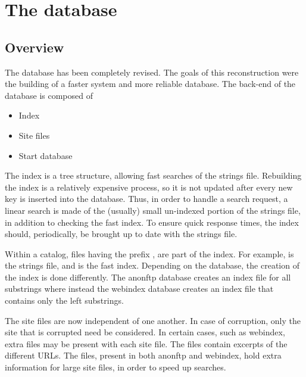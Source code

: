 %
%
%
%




\chapter{The database}
\label{chap:db}
\new

\section{Overview}

The database has been completely revised. The goals of this reconstruction
were the building of a faster system and more reliable database.  The back-end
of the database is composed of


\begin{itemize}
\item Index
\item Site files
\item Start database
\end{itemize}


The index is a tree structure, allowing fast searches of the strings file.
Rebuilding the index is a relatively expensive process, so it is not updated
after every new key is inserted into the database.  Thus, in order to handle a
search request, a linear search is made of the (usually) small un-indexed
portion of the strings file, in addition to checking the fast index.  To
ensure quick response times, the index should, periodically, be brought up to
date with the strings file.


Within a catalog, files having the prefix , are part of
the index.  For example,  is the strings file, and
 is the fast index. Depending on the database, the
creation of the index is done differently. The anonftp database creates an
index file for all substrings where instead the webindex database creates
an index file that contains only the left substrings. 


The site files are now independent of one another. In case of corruption, only
the site that is corrupted need be considered. In certain cases, such as
webindex, extra files may be present with each site file. The
 files contain excerpts of the different URLs.
The  files, present in both anonftp and webindex, hold extra information
for large site files, in order to speed up searches.

